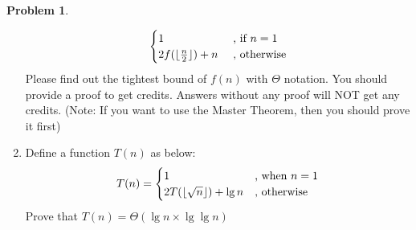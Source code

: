 \documentclass[12pt,a4paper]{report}
\theoremstyle{definition}
\newtheorem{problem}{\textbf{Problem}}
\theoremstyle{definition}
\DeclarePairedDelimiter\floor{\lfloor}{\rfloor}
\begin{document}
\begin{problem}
\begin{enumerate}[label=\arabic*.]
\begin{equation*}
           \begin{cases}
           1 &\text{ , if } n = 1\\
           2f(\floor{\frac{n}{2}}) + n &\text{ , otherwise}
           \end{cases}
    \end{equation*}
Please find out the tightest bound of $f(n)$ with $\Theta$ notation.
You should provide a proof to get credits.
Answers without any proof will NOT get any credits.
(Note: If you want to use the Master Theorem, then you should prove it first)
\item Define a function $T(n)$ as below:
    \begin{equation*}
    T(n) = 
           \begin{cases}
           1 &\text{, when } n = 1\\
           2T(\floor{\sqrt{n}}) + \lg n &\text{, otherwise}
           \end{cases}
    \end{equation*}
Prove that $T(n) = \Theta(\lg n \times \lg\lg n)$

\end{enumerate}


\end{problem}

\newpage
\end{document}
